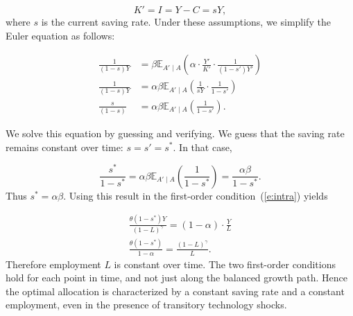 \documentclass{article}
\begin{document}
\[
K'=I=Y-C=s Y,
\]
where $s$ is the current saving rate. Under these assumptions, we simplify the Euler equation as follows:

\[
\begin{align*}
\frac{1}{\left(1-s\right) Y}&=\beta \mathbb{E}_{A'\mid A}\left(\alpha\cdot \frac{Y'}{K'}\cdot \frac{1}{(1-s') Y'}\right)\\
\frac{1}{\left(1-s\right) Y}&=\alpha \beta \mathbb{E}_{A'\mid A}\left(\frac{1}{s Y}\cdot \frac{1}{1-s'}\right)\\
\frac{s}{\left(1-s\right) } & =\alpha \beta \mathbb{E}_{A'\mid A}\left(\frac{1}{1-s'}\right).
\end{align*}
\]

We solve this equation by guessing and verifying. We guess that the saving rate remains constant over time: $s=s'=s^*$. In that case, 

\[
\frac{s^*}{1-s^*}=\alpha \beta \mathbb{E}_{A'\mid A}\left(\frac{1}{1-s^*}\right)=\frac{\alpha \beta}{1-s^*}.
\]
Thus $s^* =\alpha \beta$. Using this result in the first-order condition~(\ref{e:intra}) yields

\[
\begin{align*}
\frac{\theta (1-s^*) Y}{(1-L)^{\gamma}} =(1-\alpha)\cdot \frac{Y}{L}\\
\frac{\theta (1-s^*)}{1-\alpha} = \frac{(1-L)^{\gamma}}{L}.
\end{align*}
\]
Therefore employment $L$ is constant over time. The two first-order conditions hold for each point in time, and not just along the balanced growth path. Hence the optimal allocation is characterized by a constant saving rate and a constant employment, even in the presence of transitory technology shocks.
\end{document}
